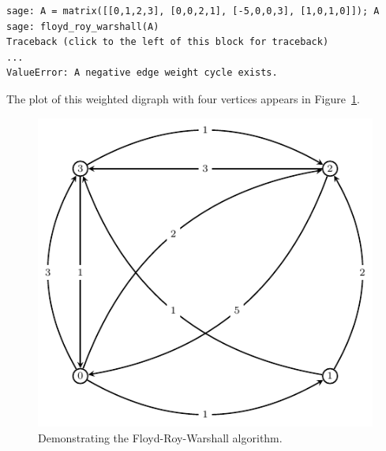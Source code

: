 %
%
%
%

\begin{lstlisting}
sage: A = matrix([[0,1,2,3], [0,0,2,1], [-5,0,0,3], [1,0,1,0]]); A
sage: floyd_roy_warshall(A)
Traceback (click to the left of this block for traceback)
...
ValueError: A negative edge weight cycle exists.
\end{lstlisting}

The plot of this weighted digraph with four vertices appears in
Figure~\ref{fig:graph_algorithms:Floyd_Roy_Warshall_demo}.

\begin{figure}[!htbp]
\centering
{}
\includegraphics{image/graph-algorithms/Floyd-Roy-Warshall-demo}
\caption{Demonstrating the Floyd-Roy-Warshall algorithm.}
\label{fig:graph_algorithms:Floyd_Roy_Warshall_demo}
\end{figure}

